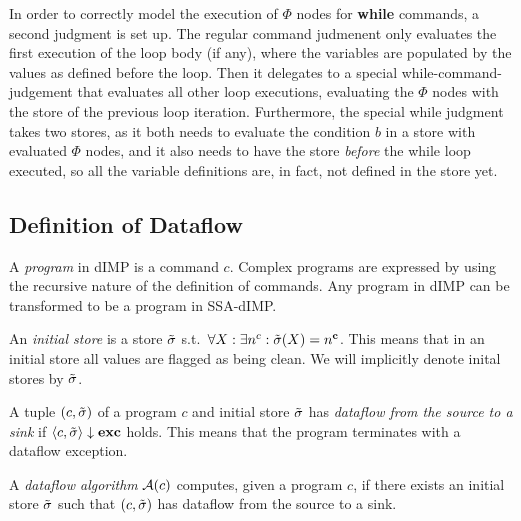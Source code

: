 In order to correctly model the execution of $\Phi$ nodes for \textbf{while} commands,
a second judgment is set up.
The regular command judmenent only evaluates the first execution of the loop body
(if any), where the variables are populated by the values as defined before the loop.
Then it delegates to a special while-command-judgement that evaluates all other 
loop executions, evaluating the $\Phi$ nodes with the store of the previous loop 
iteration.
Furthermore, the special while judgment takes two stores, as it both needs to evaluate
the condition $b$ in a store with evaluated $\Phi$ nodes, and it also needs to have
the store \emph{before} the while loop executed, so all the variable definitions are,
in fact, not defined in the store yet.

\subsection{Definition of Dataflow}
\begin{definition}[Program]
    A \emph{program} in dIMP is a command $c$.
    Complex programs are expressed by using the recursive nature of
    the definition of commands.
    Any program in dIMP can be transformed to be a program in SSA-dIMP.
\end{definition}

\begin{definition}
    An \emph{initial store} is a store $\tilde{\sigma}$ s.t.\ 
    $\forall X: \exists n^c: \tilde{\sigma}(X) = n^\textbf{c}{}$.
    This means that in an initial store all values are flagged as being clean.
    We will implicitly denote inital stores by $\tilde{\sigma}$.
\end{definition}

\begin{definition}[Dataflow]
    A tuple $(c, \tilde{\sigma})$ of a program $c$ and initial store $\tilde{\sigma}{}$ 
    has \emph{dataflow from the source to a sink} if
    $\langle c, \tilde{\sigma}{} \rangle \downarrow \textbf{exc}$ holds.
    This means that the program terminates with a dataflow exception.
\end{definition}

\begin{definition}
    A \emph{dataflow algorithm} $\operatorname{\mathcal{A}}(c)$ computes, given a program $c$,
    if there exists an initial store $\tilde{\sigma}{}$ 
    such that $(c, \tilde{\sigma})$ has dataflow from the source to a sink.
\end{definition}

